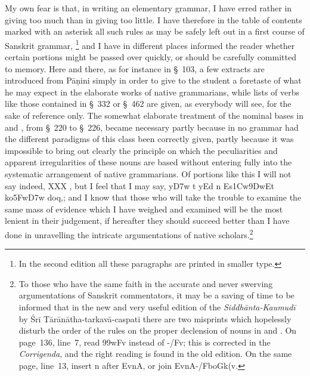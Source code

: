 My own fear is that, in writing an elementary grammar, I have erred
rather in giving too much than in giving too little. I have therefore in
the table of contents marked with an asterisk all such rules as may be
safely left out in a first course of Sanskrit grammar,%
\footnote{In the second edition all these paragraphs are printed in
  smaller type.}
and I have in different places informed the reader whether certain
portions might be passed over quickly, or should be carefully committed
to memory. Here and there, as for instance in \S~103, a few extracts are
introduced from Pāṇini simply in order to give to the student a
foretaste of what he may expect in the elaborate works of native
grammarians, while lists of verbs like those contained in \S~332 or
\S~462 are given, as everybody will see, for the sake of reference only.
The somewhat elaborate treatment of the nominal bases in  and
, from \S~220 to \S~226, became necessary partly because in no
grammar had the different paradigms of this class been correctly given,
partly because it was impossible to bring out clearly the principle on
which the peculiarities and apparent irregularities of these nouns are
based without entering fully into the systematic arrangement of native
grammarians. Of portions like this I will not say indeed, %
XXX
, but I feel that I may say, %
{\dn y\3D7w\? t\? yEd n Es\31Cw\39DwEt ko\35Fw\3D7w doq,}; and I know that those
who will take the trouble to examine the same mass of evidence which I
have weighed and examined will be the most lenient in their judgement,
if hereafter they should succeed better than I have done in unravelling
the intricate argumentations of native scholars.\footnote{To those who
  have the same faith in the accurate and never swerving argumentations
  of Sanskrit commentators, it may be a saving of time to be informed
  that in the new and very useful edition of the
  \emph{Siddhānta-Kaumudī} by Śrī Tārānātha-tarkavā-caspati there are
  two misprints which hopelessly disturb the order of the rules on the
  proper declension of nouns in  and . On page~136, line~7,
  read {\dn \399wFv} instead of {\dn -/Fv}; this is corrected in the
  \emph{Corrigenda}, and the right reading is found in the old edition.
  On the same page, line~13, insert {\dn n} after {\dn EvnA}, or join
  {\dn EvnA-/FboGk(v\2}.}

